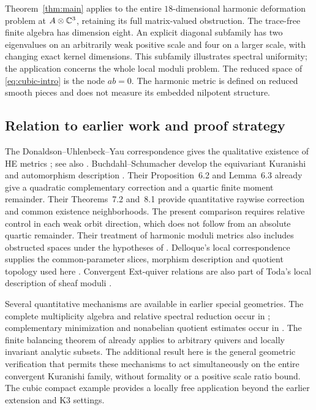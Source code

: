 Theorem~\ref{thm:main} applies to the entire $18$-dimensional harmonic
deformation problem at $A\otimes\mathbb C^3$, retaining its full matrix-valued
obstruction. The trace-free finite algebra has dimension eight.
An explicit diagonal subfamily has two eigenvalues on an arbitrarily
weak positive scale and four on a larger scale, with changing exact
kernel dimensions. This subfamily illustrates spectral uniformity;
the application concerns the whole local moduli problem.
The reduced space of \eqref{eq:cubic-intro} is the node $ab=0$.
The harmonic metric is defined on reduced smooth pieces and does not
measure its embedded nilpotent structure.

\subsection{Relation to earlier work and proof strategy}
The Donaldson--Uhlenbeck--Yau correspondence gives the qualitative
existence of HE metrics \cite{donaldson,uy}; see also \cite{kobayashi}.
Buchdahl--Schumacher develop the equivariant Kuranishi and automorphism
description \cite{bs22}. Their Proposition~6.2 and Lemma~6.3 already
give a quadratic complementary correction and a quartic finite moment
remainder. Their Theorems~7.2 and~8.1 provide quantitative raywise
correction and common existence neighborhoods. The present comparison
requires relative control in each weak orbit direction, which does
not follow from an absolute quartic remainder.
Their treatment of harmonic moduli metrics also includes obstructed
spaces under the hypotheses of \cite[Theorem~11]{bs21}.
Delloque's local correspondence supplies the common-parameter slices,
morphism description and quotient topology used here
\cite[Section~3.2, Propositions~4.3, 4.5, 5.6,
Corollary~5.2 and Theorem~7.4]{delloque}.
Convergent Ext-quiver relations are also part of Toda's local
description of sheaf moduli \cite[Theorem~1.1]{toda}.

Several quantitative mechanisms are available in earlier special
geometries. The complete multiplicity algebra and relative spectral
reduction occur in \cite{wuebben4}; complementary minimization and
nonabelian quotient estimates occur in \cite{wuebben6,wuebben7}.
The finite balancing theorem of \cite{wuebben14} already applies to
arbitrary quivers and locally invariant analytic subsets.
The additional result here is the general geometric verification
that permits these mechanisms to act simultaneously on the entire
convergent Kuranishi family, without formality or a positive scale
ratio bound. The cubic compact example provides a locally free
application beyond the earlier extension and K3 settings.

